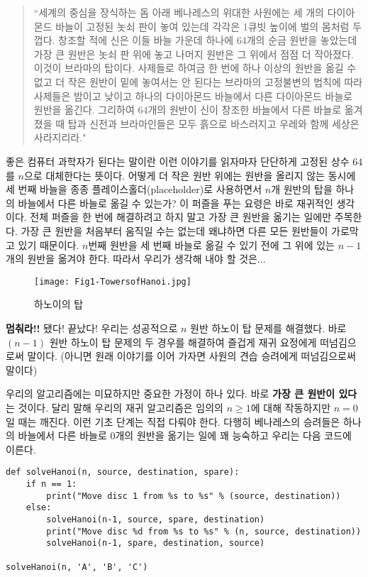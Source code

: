 \documentclass[a4paper]{oblivoir}
\begin{document}
\begin{quote}
    ``세계의 중심을 장식하는 돔 아래 베나레스의 위대한 사원에는 세 개의 다이아몬드 바늘이 고정된 놋쇠 판이 놓여 있는데 각각은 1큐빗 높이에 벌의 몸처럼 두껍다. 창조할 적에 신은 이들 바늘 가운데 하나에 64개의 순금 원반을 놓았는데 가장 큰 원반은 놋쇠 판 위에 놓고 나머지 원반은 그 위에서 점점 더 작아졌다. 이것이 브라마의 탑이다. 사제들로 하여금 한 번에 하나 이상의 원반을 옮길 수 없고 더 작은 원반이 밑에 놓여서는 안 된다는 브라마의 고정불변의 법칙에 따라 사제들은 밤이고 낮이고 하나의 다이아몬드 바늘에서 다른 다이아몬드 바늘로 원반을 옮긴다. 그리하여 64개의 원반이 신이 창조한 바늘에서 다른 바늘로 옮겨졌을 때 탑과 신전과 브라마인들은 모두 흙으로 바스러지고 우레와 함께 세상은 사라지리라."
\end{quote}

 좋은 컴퓨터 과학자가 된다는 말이란 이런 이야기를 읽자마자 단단하게 고정된 상수 $64$를 $n$으로 대체한다는 뜻이다. 어떻게 더 작은 원반 위에는 원반을 올리지 않는 동시에 세 번째 바늘을 종종 플레이스홀더(placeholder)로 사용하면서 $n$개 원반의 탑을 하나의 바늘에서 다른 바늘로 옮길 수 있는가? 이 퍼즐을 푸는 요령은 바로 재귀적인 생각이다. 전체 퍼즐을 한 번에 해결하려고 하지 말고 가장 큰 원반을 옮기는 일에만 주목한다. 가장 큰 원반을 처음부터 움직일 수는 없는데 왜냐하면 다른 모든 원반들이 가로막고 있기 때문이다. $n$번째 원반을 세 번째 바늘로 옮길 수 있기 전에 그 위에 있는 $n-1$개의 원반을 옮겨야 한다. 따라서 우리가 생각해 내야 할 것은...

\begin{figure}[h]
    \centering
    \texttt{[image: Fig1-TowersofHanoi.jpg]}
    \caption{하노이의 탑}
\end{figure}

\textbf{멈춰라!!} 됐다! 끝났다! 우리는 성공적으로 $n$ 원반 하노이 탑 문제를 해결했다. 바로 $(n-1)$ 원반 하노이 탑 문제의 두 경우를 해결하여 즐겁게 재귀 요정에게 떠넘김으로써 말이다. (아니면 원래 이야기를 이어 가자면 사원의 견습 승려에게 떠넘김으로써 말이다)

우리의 알고리즘에는 미묘하지만 중요한 가정이 하나 있다. 바로  \textbf{가장 큰 원반이 있다}는 것이다. 달리 말해 우리의 재귀 알고리즘은 임의의 $n\geq 1$에 대해 작동하지만 $n=0$일 때는 깨진다. 이런 기초 단계는 직접 다뤄야 한다. 다행히 베나레스의 승려들은 하나의 바늘에서 다른 바늘로 $0$개의 원반을 옮기는 일에 꽤 능숙하고 우리는 다음 코드에 이른다.

\begin{verbatim}
def solveHanoi(n, source, destination, spare):
	if n == 1:
		print("Move disc 1 from %s to %s" % (source, destination))
	else:
		solveHanoi(n-1, source, spare, destination)
		print("Move disc %d from %s to %s" % (n, source, destination))
		solveHanoi(n-1, spare, destination, source)

solveHanoi(n, 'A', 'B', 'C')
\end{verbatim}
\end{document}
